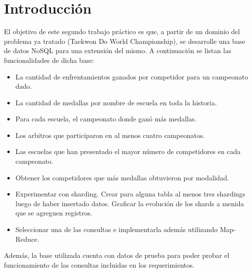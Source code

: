 \section{Introducción}

El objetivo de este segundo trabajo práctico es que, a partir de un dominio del problema ya tratado (Taekwon Do World Championship), se desarrolle una base de datos NoSQL para una extensión del mismo. A continuación se listan las funcionalidades de dicha base:

\begin{itemize}

	\item La cantidad de enfrentamientos ganados por competidor para un campeonato dado.
	\item La cantidad de medallas por nombre de escuela en toda la historia.
	\item Para cada escuela, el campeonato donde ganó más medallas.
	\item Los arbitros que participaron en al menos cuatro campeonatos.
	\item Las escuelas que han presentado el mayor número de competidores en cada campeonato.
	\item Obtener los competidores que más medallas obtuvieron por modalidad.
	\item Experimentar con sharding. Crear para alguna tabla al menos tres shardings luego de haber insertado datos. Graficar la evolución de los shards a menida que se agreguen registros.
	\item Seleccionar una de las consultas e implementarla además utilizando Map-Reduce.
	
\end{itemize}

 Además, la base utilizada cuenta con datos de prueba para poder probar el funcionamiento de las consultas incluidas en los requerimientos.